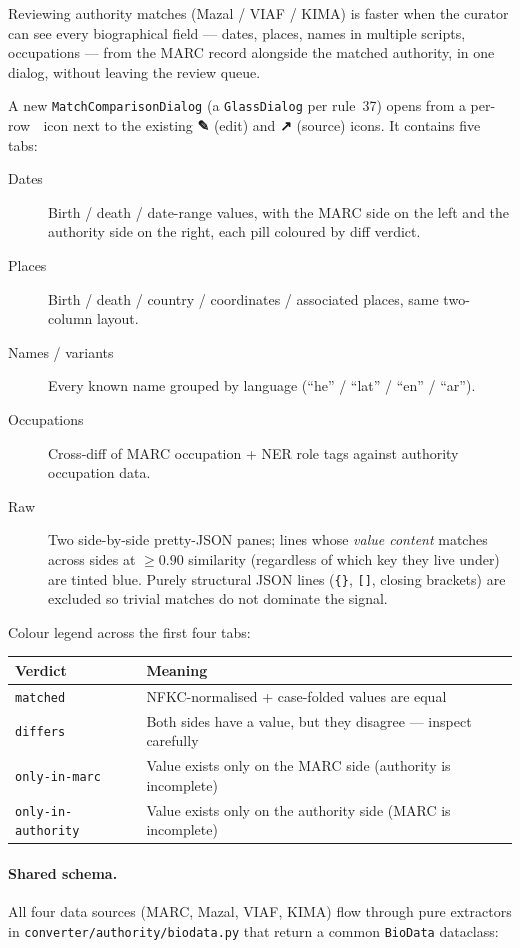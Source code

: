 \documentclass[12pt]{article}
\newcommand{\filepath}[1]{\texttt{\small #1}}
\newcommand{\code}[1]{\texttt{#1}}
\begin{document}
Reviewing authority matches (Mazal / VIAF / KIMA) is faster when the curator can see every biographical field --- dates, places, names in multiple scripts, occupations --- from the MARC record alongside the matched authority, in one dialog, without leaving the review queue.

A new \code{MatchComparisonDialog} (a \code{GlassDialog} per rule~37) opens from a per-row \textbf{🧬} icon next to the existing \textbf{✎} (edit) and \textbf{↗} (source) icons. It contains five tabs:

\begin{description}
\item[Dates] Birth / death / date-range values, with the MARC side on the left and the authority side on the right, each pill coloured by diff verdict.
\item[Places] Birth / death / country / coordinates / associated places, same two-column layout.
\item[Names / variants] Every known name grouped by language (``he'' / ``lat'' / ``en'' / ``ar'').
\item[Occupations] Cross-diff of MARC occupation + NER role tags against authority occupation data.
\item[Raw] Two side-by-side pretty-JSON panes; lines whose \emph{value content} matches across sides at $\ge 0.90$ similarity (regardless of which key they live under) are tinted blue. Purely structural JSON lines (\code{\{\}}, \code{[]}, closing brackets) are excluded so trivial matches do not dominate the signal.
\end{description}

Colour legend across the first four tabs:

\begin{longtable}{|l|l|}
\hline
\textbf{Verdict} & \textbf{Meaning} \\
\hline
\code{matched}            & NFKC-normalised + case-folded values are equal \\
\hline
\code{differs}            & Both sides have a value, but they disagree --- inspect carefully \\
\hline
\code{only-in-marc}       & Value exists only on the MARC side (authority is incomplete) \\
\hline
\code{only-in-authority}  & Value exists only on the authority side (MARC is incomplete) \\
\hline
\end{longtable}

\paragraph{Shared schema.}
All four data sources (MARC, Mazal, VIAF, KIMA) flow through pure extractors in \filepath{converter/authority/biodata.py} that return a common \code{BioData} dataclass:
\end{document}
